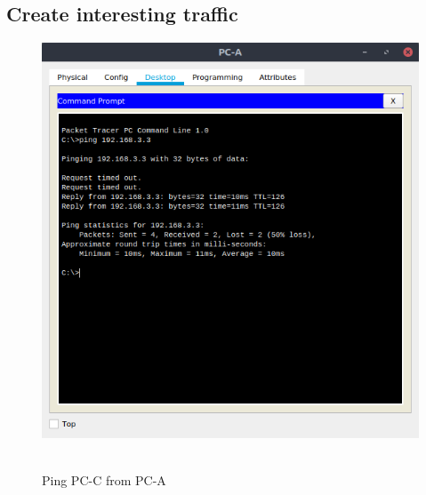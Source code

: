 \documentclass[12pt]{extarticle}
\begin{document}
\subsection{Create interesting traffic}
\begin{center}
\begin{figure}[H]
\includegraphics[scale=0.7]{resources/q32.png}\
\caption{Ping PC-C from PC-A}
\end{figure}
\end{center}
\end{document}

